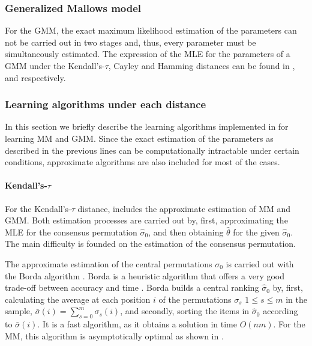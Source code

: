 \documentclass[article,nojss]{jss}
\begin{document}
\subsubsection{Generalized Mallows model}%
For the GMM, the exact maximum likelihood estimation of the parameters can not be carried out in two stages and, thus, every parameter must be simultaneously estimated. The expression of the MLE for the parameters of a GMM under the Kendall's-$\tau$, Cayley and Hamming distances can be found in \cite{Mandhani2009}, \cite{Irurozki2014b} and \cite{Irurozki2014a} respectively. 


\subsubsection{Learning algorithms under each distance}%
In this section we briefly describe the learning algorithms implemented in  for learning MM and GMM. Since the exact estimation of the parameters as described in the previous lines can be computationally intractable under certain conditions, approximate algorithms are also included for most of the cases. 

\paragraph{Kendall's-$\tau$}
For the Kendall's-$\tau$ distance,  includes the approximate estimation of MM and GMM. Both estimation processes are carried out by, first, approximating the MLE for the consensus permutation $\hat \sigma_0$, and then obtaining $\hat \theta$ for the given $\hat\sigma_0$. The main difficulty is founded on the estimation of the consensus permutation. 

The approximate estimation of the central permutations $\sigma_0$ is carried out with the Borda algorithm \citep{Borda1781}. Borda is a heuristic algorithm that offers a very good trade-off between accuracy and time \citep{Ali2011}. Borda builds a central ranking $\hat \sigma_0$ by, first, calculating the average at each position $i$ of the permutations $\sigma_s$ $1\leq s \leq m$ in the sample, $\bar \sigma(i) = \sum_{s=0}^m \sigma_s(i)$, and secondly, sorting the items in $\hat \sigma_0$ according to $\bar \sigma(i)$. It is a fast algorithm, as it obtains a solution in time $O(nm)$. For the MM, this algorithm is asymptotically optimal as shown in \cite{gMallows}. 
\end{document}
